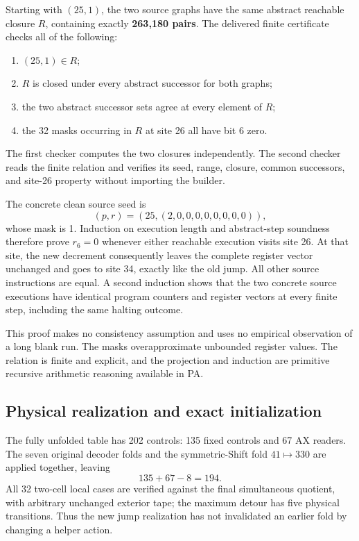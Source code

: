 Starting with $(25,1)$, the two source graphs have the same abstract reachable
closure $R$, containing exactly \textbf{263,180 pairs}. The delivered finite
certificate checks all of the following:
\begin{enumerate}
\item $(25,1)\in R$;
\item $R$ is closed under every abstract successor for both graphs;
\item the two abstract successor sets agree at every element of $R$;
\item the 32 masks occurring in $R$ at site 26 all have bit 6 zero.
\end{enumerate}
The first checker computes the two closures independently. The second checker
reads the finite relation and verifies its seed, range, closure, common
successors, and site-26 property without importing the builder.

The concrete clean source seed is
\[
 (p,r)=(25,(2,0,0,0,0,0,0,0,0)),
\]
whose mask is 1. Induction on execution length and abstract-step soundness
therefore prove $r_6=0$ whenever either reachable execution visits site 26.
At that site, the new decrement consequently leaves the complete register
vector unchanged and goes to site 34, exactly like the old jump. All other
source instructions are equal. A second induction shows that the two
concrete source executions have identical program counters and register
vectors at every finite step, including the same halting outcome.

This proof makes no consistency assumption and uses no empirical observation
of a long blank run. The masks overapproximate unbounded register values.
The relation is finite and explicit, and the projection and induction are
primitive recursive arithmetic reasoning available in PA.

\subsection{Physical realization and exact initialization}

The fully unfolded table has 202 controls: 135 fixed controls and 67 AX
readers. The seven original decoder folds and the symmetric-Shift fold
$41\mapsto330$ are applied together, leaving
\[
                    135+67-8=194.
\]
All 32 two-cell local cases are verified against the final simultaneous
quotient, with arbitrary unchanged exterior tape; the maximum detour has
five physical transitions. Thus the new jump realization has not invalidated
an earlier fold by changing a helper action.

